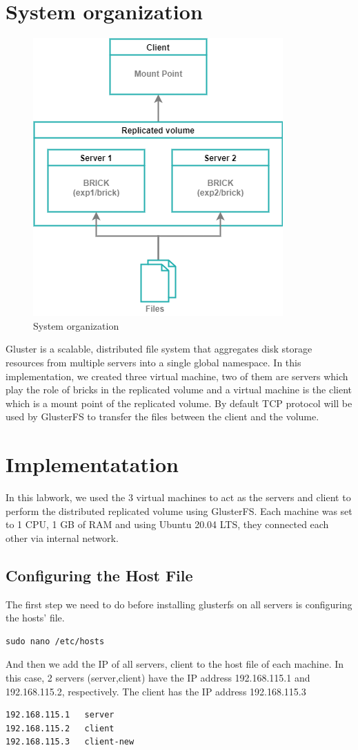 \documentclass[times, 10pt]{thesisMDH}
\begin{document}
\titlePage

\newpage

\mainmatter

\section{System organization}
\begin{figure}[H]
    \centering
    \includegraphics[width = 0.6\linewidth]{images/img61.png}
    \caption{System organization}
\end{figure}
Gluster is a scalable, distributed file system that aggregates disk storage resources from multiple servers into a single global namespace. In this implementation, we created three virtual machine, two of them are servers which play the role of bricks in the replicated volume and a virtual machine is the client which is a mount point of the replicated volume. By default TCP protocol will be used by GlusterFS to transfer the files between the client and the volume.

\section{Implementatation}
In this labwork, we used the 3 virtual machines to act as the servers and client to perform the distributed replicated volume using GlusterFS. Each machine was set to 1 CPU, 1 GB of RAM and using Ubuntu 20.04 LTS, they connected each other via internal network.
\subsection{Configuring the Host File}
The first step we need to do before installing glusterfs on all servers is configuring the hosts’ file.
\begin{lstlisting}
sudo nano /etc/hosts
\end{lstlisting}
And then we add the IP of all servers, client to the host file of each machine. In this case, 2 servers (server,client) have the IP address 192.168.115.1 and 192.168.115.2, respectively. The client has the IP address 192.168.115.3
\begin{lstlisting}
192.168.115.1   server
192.168.115.2	client
192.168.115.3	client-new
\end{lstlisting}
\end{document}
